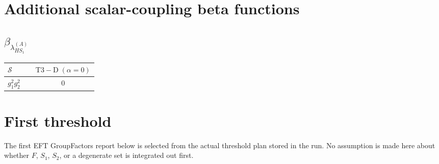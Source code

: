 \documentclass[9pt]{article}
\begin{document}
\section*{Additional scalar-coupling beta functions}
\subsection*{$ \beta_{\lambda_{HS_1}^{(A)}} $}
\begin{longtable}{@{}p{0.31\linewidth}c@{}}
\toprule
$\mathcal{S}$ & $ \mathrm{T3-D}\;(\alpha=0) $ \\
\midrule
$ g_1^2g_2^2 $ & $ 0 $ \\
\bottomrule
\end{longtable}
\section*{First threshold}
The first EFT GroupFactors report below is selected from the actual threshold plan stored in the run.  No assumption is made here about whether $F$, $S_1$, $S_2$, or a degenerate set is integrated out first.
\end{document}
